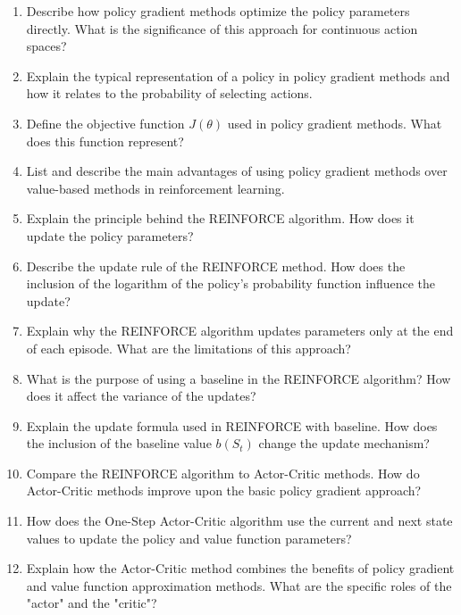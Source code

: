 \begin{enumerate}

	\item Describe how policy gradient methods optimize the policy parameters directly. What is the significance of this approach for continuous action spaces?
    \item Explain the typical representation of a policy in policy gradient methods and how it relates to the probability of selecting actions.
    \item Define the objective function $J(\theta)$ used in policy gradient methods. What does this function represent?
    \item List and describe the main advantages of using policy gradient methods over value-based methods in reinforcement learning.
    \item Explain the principle behind the REINFORCE algorithm. How does it update the policy parameters?
    \item Describe the update rule of the REINFORCE method. How does the inclusion of the logarithm of the policy's probability function influence the update?
    \item Explain why the REINFORCE algorithm updates parameters only at the end of each episode. What are the limitations of this approach?
    \item What is the purpose of using a baseline in the REINFORCE algorithm? How does it affect the variance of the updates?
    \item Explain the update formula used in REINFORCE with baseline. How does the inclusion of the baseline value $b(S_t)$ change the update mechanism?
    \item Compare the REINFORCE algorithm to Actor-Critic methods. How do Actor-Critic methods improve upon the basic policy gradient approach?
    \item How does the One-Step Actor-Critic algorithm use the current and next state values to update the policy and value function parameters?
    \item Explain how the Actor-Critic method combines the benefits of policy gradient and value function approximation methods. What are the specific roles of the "actor" and the "critic"?
\end{enumerate}
